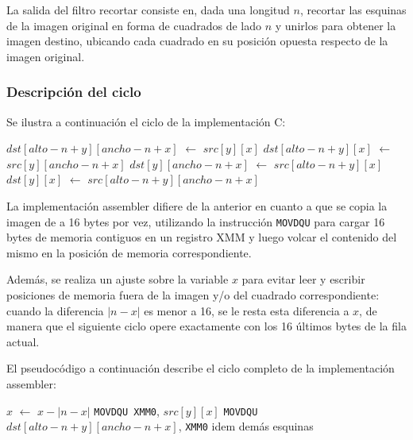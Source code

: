 La salida del filtro recortar consiste en, dada una longitud $n$, recortar las esquinas de la imagen
original en forma de cuadrados de lado $n$ y unirlos para obtener la imagen destino, ubicando cada
cuadrado en su posición opuesta respecto de la imagen original.

\subsubsection{Descripción del ciclo}

Se ilustra a continuación el ciclo de la implementación C:

\begin{algorithmic}
            \STATE $dst[alto - n + y][ancho - n + x]$ $\leftarrow$ $src[y][x]$ 
            \STATE $dst[alto - n + y][x]$ $\leftarrow$ $src[y][ancho - n + x]$ 
            \STATE $dst[y][ancho - n + x]$ $\leftarrow$ $src[alto - n + y][x]$ 
            \STATE $dst[y][x]$ $\leftarrow$ $src[alto - n + y][ancho - n + x]$ 
        \ENDFOR
    \ENDFOR
\end{algorithmic}

La implementación assembler difiere de la anterior en cuanto a que se copia la imagen de a 16 bytes por vez,
utilizando la instrucción \texttt{MOVDQU} para cargar 16 bytes de memoria contiguos en un registro XMM 
y luego volcar el contenido del mismo en la posición de memoria correspondiente.

Además, se realiza un ajuste sobre la variable $x$ para evitar leer y escribir posiciones de memoria fuera
de la imagen y/o del cuadrado correspondiente: cuando la diferencia $|n - x|$ es menor a 16, se le resta
esta diferencia a $x$, de manera que el siguiente ciclo opere exactamente con los 16 últimos bytes de la fila actual.

El pseudocódigo a continuación describe el ciclo completo de la implementación assembler:

\begin{algorithmic}
                \STATE $x$ $\leftarrow$ $x - |n - x|$
            \ENDIF
            \STATE \texttt{MOVDQU XMM0}, $src[y][x]$ 
            \STATE \texttt{MOVDQU} $dst[alto - n + y][ancho - n + x]$, \texttt{XMM0}             
            \STATE idem demás esquinas
        \ENDFOR
    \ENDFOR
\end{algorithmic}

